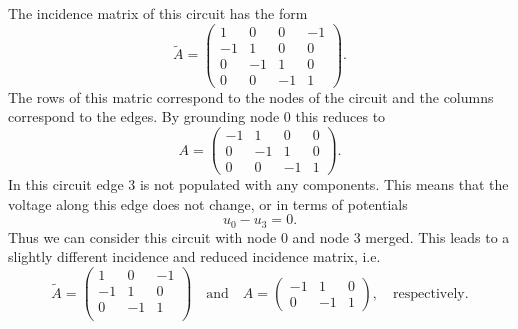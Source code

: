The incidence matrix of this circuit has the form
\begin{displaymath}
	\tilde{A} = 
	\left(
	\begin{matrix}
		1 & 0 & 0 & -1 \\
		-1 & 1 & 0 & 0 \\
		0 & -1 & 1 & 0 \\
		0 & 0 & -1 & 1 
	\end{matrix}
	\right).
\end{displaymath}
The rows of this matric correspond to the nodes of the circuit and the columns correspond to the edges. By grounding node 0 this reduces to
\begin{displaymath}
	A = 
	\left(
	\begin{matrix}
		-1 & 1 & 0 & 0 \\
		0 & -1 & 1 & 0 \\
		0 & 0 & -1 & 1 
	\end{matrix}
	\right).
\end{displaymath}
In this circuit edge 3 is not populated with any components. This means that the voltage along this edge does not change, or in terms of potentials
\begin{displaymath}
	u_0 - u_3 = 0.
\end{displaymath}
Thus we can consider this circuit with node 0 and node 3 merged. This leads to a slightly different incidence and reduced incidence matrix, i.e.
\begin{displaymath}
	\tilde{A} = 
	\left(
	\begin{matrix}
		1 & 0 & -1 \\
		-1 & 1 & 0 \\
		0 & -1 & 1 \\
	\end{matrix}
	\right) \quad \text{and} \quad
	A = 
	\left(
	\begin{matrix}
		-1 & 1 & 0 \\
		0 & -1 & 1 
	\end{matrix}
	\right), \quad \text{respectively.}
\end{displaymath}


